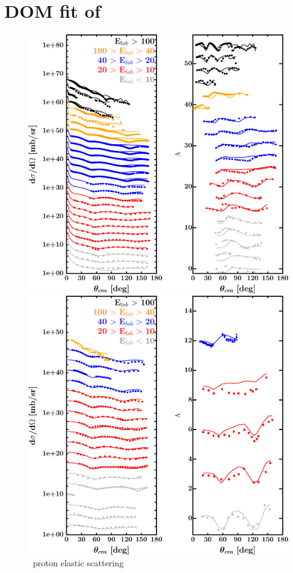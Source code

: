 \section{DOM fit of \oSix}
\label{o16DOMOutput}
\begin{figure}[hbtp]
    \centering
    \begin{minipage}{0.47\textwidth}
        \centering
        \includegraphics[width=\textwidth]{figures/o16_protonElastic.png}
        \caption*{\oSix\ proton elastic scattering}
        \label{DOMFitData_o16_proton_elastic}
    \end{minipage}\hspace{6pt}
    \begin{minipage}{0.47\textwidth}
        \centering
        \includegraphics[width=\textwidth]{figures/o16_neutronElastic.png}

\end{minipage}
\end{figure}
